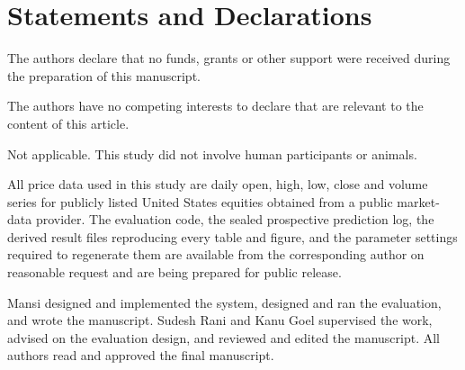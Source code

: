 \documentclass[pdflatex,sn-apa]{sn-jnl}%
\theoremstyle{thmstyleone}%
\theoremstyle{thmstyletwo}%
\theoremstyle{thmstylethree}%
\begin{document}
\section*{Statements and Declarations}

The authors declare that no funds, grants or other support were received during
the preparation of this manuscript.

The authors have no competing interests to declare that are relevant to the
content of this article.

Not applicable. This study did not involve human participants or animals.

All price data used in this study are daily open, high, low, close and volume
series for publicly listed United States equities obtained from a public
market-data provider. The evaluation code, the sealed prospective prediction
log, the derived result files reproducing every table and figure, and the
parameter settings required to regenerate them are available from the
corresponding author on reasonable request and are being prepared for public
release.

Mansi designed and implemented the system, designed and ran the evaluation, and
wrote the manuscript. Sudesh Rani and Kanu Goel supervised the work, advised on
the evaluation design, and reviewed and edited the manuscript. All authors read
and approved the final manuscript.



\end{document}
